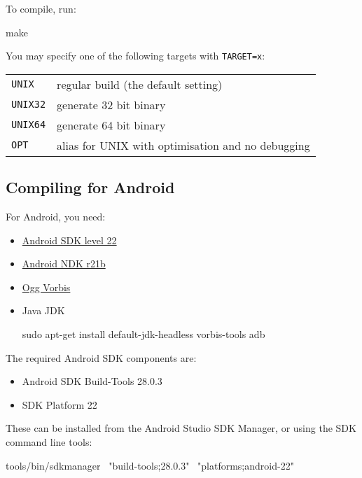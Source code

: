 To compile, run:

\begin{verbatim*}
make
\end{verbatim*}

You may specify one of the following targets with \texttt{TARGET=x}:

\begin{tabularx}{1.9\textwidth}{lX}

\texttt{UNIX} & regular build (the default setting) \\

\texttt{UNIX32} & generate 32 bit binary \\

\texttt{UNIX64} & generate 64 bit binary \\

\texttt{OPT} & alias for UNIX with optimisation and no debugging \\

\end{tabularx}

\subsection{Compiling for Android}

For Android, you need:

\begin{itemize}
\item \href{http://developer.android.com/sdk/}{Android SDK level 22}
\item \href{http://developer.android.com/sdk/ndk/}{Android NDK r21b}
\item \href{http://www.vorbis.com/}{Ogg Vorbis}
\item {Java JDK 
\begin{verbatim*}
sudo apt-get install default-jdk-headless vorbis-tools adb
\end{verbatim*}}
\end{itemize}

The required Android SDK components are:
\begin{itemize}
\item Android SDK Build-Tools 28.0.3
\item SDK Platform 22
\end{itemize}
These can be installed from the Android Studio SDK Manager, or using the SDK
command line tools:

\begin{verbatim*}
tools/bin/sdkmanager \
  "build-tools;28.0.3" \
  "platforms;android-22"
\end{verbatim*}

